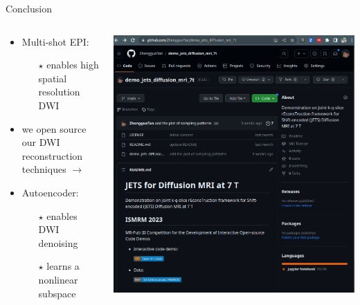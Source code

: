 \documentclass[hyperref={colorlinks=true,linkcolor=blue}, aspectratio=169]{beamer}
\begin{document}
	\begin{frame}{Conclusion}
		\begin{columns}
			\begin{column}{0.5\textwidth}
				\begin{itemize}
					\item Multi-shot EPI:
					\begin{itemize}
						\item [$\star$] enables high spatial resolution DWI
					\end{itemize}
					\vspace{1em}
					\item we open source our DWI reconstruction techniques $\rightarrow$
					\vspace{1em}
					\item Autoencoder:
					\begin{itemize}
						\item [$\star$] enables DWI denoising
						\item [$\star$] learns a nonlinear subspace 
					\end{itemize}
				\end{itemize}
			\end{column}
			
			\begin{column}{0.5\textwidth}
				\includegraphics[width=\columnwidth]{figures/github_jets.png}
			\end{column}
		\end{columns}
		
	\end{frame}
	
\end{document}

